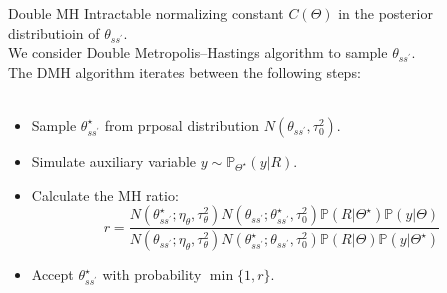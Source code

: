 \documentclass[10 pt]{beamer}
\begin{document}
\begin{frame}{Double MH }
 Intractable normalizing constant $C(\Theta)$ in the posterior distributioin of $\theta_{ss^{\prime}}$. \\
 We consider Double Metropolis–Hastings algorithm to sample $\theta_{ss^{\prime}}$. \\
 The DMH algorithm iterates between the following steps:
 ~\\
 ~\\
 \begin{itemize}
 	\item Sample $\theta_{ss^{\prime}}^{\star}$ from prposal distribution $N(\theta_{ss^{\prime}}, \tau_0^2)$.
 	\item Simulate auxiliary variable $y\sim \mathbb{P}_{\Theta^{\star}}(y|R)$.
 	\item Calculate the MH ratio:
 	$$ r = \frac{N(\theta_{ss^{\prime}}^{\star};\eta_{\theta}, \tau_{\theta}^2)N(\theta_{ss^{\prime}};\theta_{ss^{\prime}}^{\star},\tau_0^2)\mathbb{P}(R|\Theta^{\star})\mathbb{P}(y|\Theta)}{N(\theta_{ss^{\prime}};\eta_{\theta},\tau_{\theta}^2)N(\theta_{ss^{\prime}}^{\star};\theta_{ss^{\prime}},\tau_0^2)\mathbb{P}(R|\Theta)\mathbb{P}(y|\Theta^{\star})}$$
 	\item Accept $\theta_{ss^{\prime}}^{\star}$ with probability $\min \{ 1,r \}$.
 	\end{itemize}
\end{frame}
\end{document}
